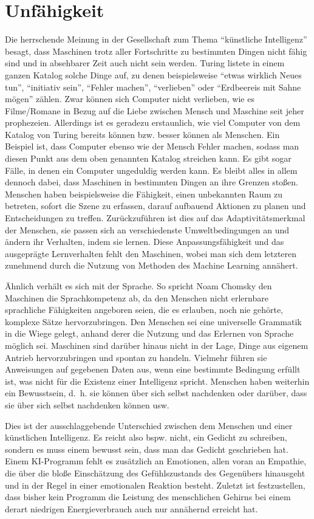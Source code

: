 \section{Unfähigkeit}
Die herrschende Meinung in der Gesellschaft zum Thema "`künstliche Intelligenz"' besagt, dass Maschinen trotz aller Fortschritte zu bestimmten Dingen nicht fähig sind und in absehbarer Zeit auch nicht sein werden.
Turing listete in einem ganzen Katalog solche Dinge auf, zu denen beispielsweise "`etwas wirklich Neues tun"', "`initiativ sein"', "`Fehler machen"', "`verlieben"' oder "`Erdbeereis mit Sahne mögen"' zählen.
Zwar können sich Computer nicht verlieben, wie es Filme/Romane in Bezug auf die Liebe zwischen Mensch und Maschine seit jeher prophezeien.
Allerdings ist es geradezu erstaunlich, wie viel Computer von dem Katalog von Turing bereits können bzw.
besser können als Menschen.
Ein Beispiel ist, dass Computer ebenso wie der Mensch Fehler machen, sodass man diesen Punkt aus dem oben genannten Katalog streichen kann.
Es gibt sogar Fälle, in denen ein Computer ungeduldig werden kann.
Es bleibt alles in allem dennoch dabei, dass Maschinen in bestimmten Dingen an ihre Grenzen stoßen.
Menschen haben beispielsweise die Fähigkeit, einen unbekannten Raum zu betreten, sofort die Szene zu erfassen, darauf aufbauend Aktionen zu planen und Entscheidungen zu treffen.
Zurückzuführen ist dies auf das Adaptivitätsmerkmal der Menschen, sie passen sich an verschiedenste Umweltbedingungen an und ändern ihr Verhalten, indem sie lernen.
Diese Anpassungsfähigkeit und das ausgeprägte Lernverhalten fehlt den Maschinen, wobei man sich dem letzteren zunehmend durch die Nutzung von Methoden des Machine Learning annähert.

Ähnlich verhält es sich mit der Sprache.
So spricht Noam Chomsky den Maschinen die
Sprachkompetenz ab, da den Menschen nicht erlernbare sprachliche Fähigkeiten angeboren seien, die es erlauben, noch nie gehörte, komplexe Sätze hervorzubringen.
Den Menschen sei eine universelle Grammatik in die Wiege gelegt, anhand derer die Nutzung und das Erlernen von Sprache möglich sei.
Maschinen sind darüber hinaus nicht in der Lage, Dinge aus eigenem Antrieb hervorzubringen und spontan zu handeln.
Vielmehr führen sie Anweisungen auf gegebenen Daten aus, wenn eine bestimmte Bedingung erfüllt ist, was nicht für die Existenz einer Intelligenz spricht.
Menschen haben weiterhin ein Bewusstsein, d.~h.
sie können über sich selbst nachdenken oder darüber, dass sie über sich selbst nachdenken können usw.

Dies ist der ausschlaggebende Unterschied zwischen dem Menschen und einer künstlichen Intelligenz.
Es reicht also bspw.
nicht, ein Gedicht zu schreiben, sondern es muss einem bewusst sein, dass man das Gedicht geschrieben hat.
Einem KI-Programm fehlt es zusätzlich an Emotionen, allen voran an Empathie, die über die bloße Einschätzung des Gefühlszustands des Gegenübers hinausgeht und in der Regel in einer emotionalen Reaktion besteht.
Zuletzt ist festzustellen, dass bisher kein Programm die Leistung des menschlichen Gehirns bei einem derart niedrigen Energieverbrauch auch nur annähernd erreicht hat.


